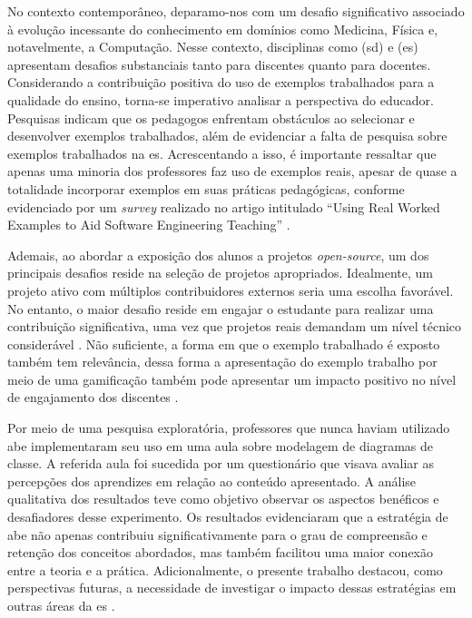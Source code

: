 No contexto contemporâneo, deparamo-nos com um desafio significativo associado à evolução incessante do conhecimento em domínios como Medicina, Física e, notavelmente, a Computação. Nesse contexto, disciplinas como (\gls{sd}) e (\gls{es}) apresentam desafios substanciais tanto para discentes quanto para docentes. Considerando a contribuição positiva do uso de exemplos trabalhados para a qualidade do ensino, torna-se imperativo analisar a perspectiva do educador. Pesquisas indicam que os pedagogos enfrentam obstáculos ao selecionar e desenvolver exemplos trabalhados, além de evidenciar a falta de pesquisa sobre exemplos trabalhados na \gls{es}. Acrescentando a isso, é importante ressaltar que apenas uma minoria dos professores faz uso de exemplos reais, apesar de quase a totalidade incorporar exemplos em suas práticas pedagógicas, conforme evidenciado por um \textit{survey} realizado no artigo intitulado ``Using Real Worked Examples to Aid Software Engineering Teaching'' \cite{Simone.Tonhao-etal:2021}.

Ademais, ao abordar a exposição dos alunos a projetos \textit{open-source}, um dos principais desafios reside na seleção de projetos apropriados. Idealmente, um projeto ativo com múltiplos contribuidores externos seria uma escolha favorável. No entanto, o maior desafio reside em engajar o estudante para realizar uma contribuição significativa, uma vez que projetos reais demandam um nível técnico considerável \cite{OSSProjects-TheProfessors'Perspective}. Não suficiente, a forma em que o exemplo trabalhado é exposto também tem relevância, dessa forma a apresentação do exemplo trabalho por meio de uma gamificação também pode apresentar um impacto positivo no nível de engajamento dos discentes \cite{Simone.Tonhao-etal:2022}.

Por meio de uma pesquisa exploratória, professores que nunca haviam utilizado \gls{abe}
implementaram seu uso em uma aula sobre modelagem de diagramas de classe. A referida aula foi sucedida por um questionário que visava avaliar as percepções dos aprendizes em relação ao conteúdo apresentado. A análise qualitativa dos resultados teve como objetivo observar os aspectos benéficos e desafiadores desse experimento. Os resultados evidenciaram que a estratégia de \gls{abe} não apenas contribuiu significativamente para o grau de compreensão e retenção dos conceitos abordados, mas também facilitou uma maior conexão entre a teoria e a prática. Adicionalmente, o presente trabalho destacou, como perspectivas futuras, a necessidade de investigar o impacto dessas estratégias em outras áreas da \gls{es} \cite{Tiago.Bonetti-etal:2023}.

